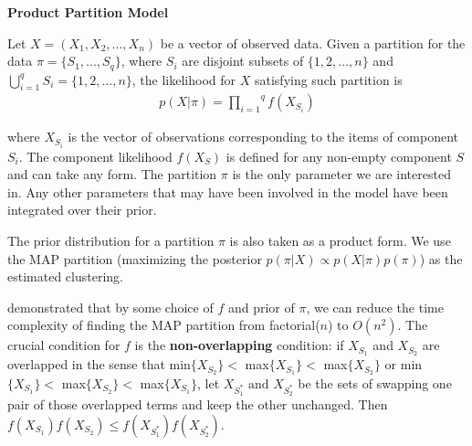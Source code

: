 \documentclass[aoas,preprint]{imsart}
\begin{document}
\noindent
{\bf Product Partition Model}

Let $X = (X_1, X_2, ...,X_n)$ be a vector of observed data. Given a partition for the data $\pi = \{S_1, ..., S_q\}$, where $S_i$ are disjoint subsets of $\{1,2,...,n\}$ and $\bigcup_{i = 1}^{q} S_i = \{1,2,...,n\}$, the likelihood for $X$ satisfying such partition is
\begin{eqnarray*}
p(X|\pi) = \overset{q}{\underset{i = 1}{\prod}}f(X_{S_i})
\end{eqnarray*}

where $X_{S_i}$ is the vector of observations corresponding to the items of component $S_i$. The component likelihood $f(X_{S})$ is defined for any non-empty component $S$ and can take any form. The partition $\pi$ is the only parameter we are interested in.
Any other parameters that may have been involved in the model have been integrated over their prior.

The prior distribution for a partition $\pi$ is also taken as a product form. We use the MAP partition (maximizing the posterior $p(\pi | X) \propto p(X|\pi) p(\pi)$) as the estimated clustering.

\cite{ref:dahl} demonstrated that by some choice of $f$ and prior of $\pi$, we can reduce the time complexity of finding the MAP partition from factorial($n$) to $O(n^2)$.
The crucial condition for $f$ is the \textbf{non-overlapping} condition:
if $X_{S_1}$ and $X_{S_2}$ are overlapped in the sense that  min$\{X_{S_2}\}  <$ max$\{X_{S_1}\}  <$ max$\{X_{S_2}\}$ or min$\{X_{S_1}\}  <$ max$\{X_{S_2}\}  <$ max$\{X_{S_1}\}$, 
let $X_{S_1^*} \text{ and } X_{S_2^*}$ be the sets of swapping one pair of those overlapped terms and keep the other unchanged. Then $f(X_{S_1}) f(X_{S_2}) \leq f(X_{S_1^*}) f(X_{S_2^*})$.\\
\end{document}
